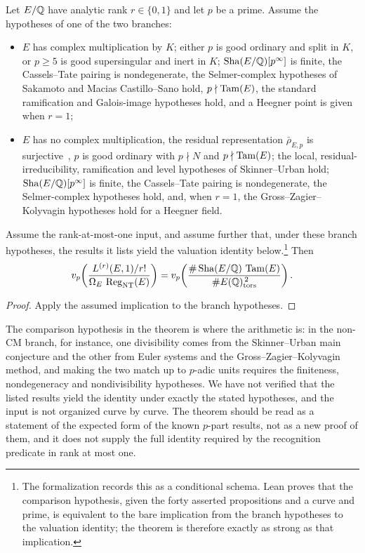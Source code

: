 \begin{theorem}\label{thm:closure:t-cascade-rank-le-1}
Let $E/\mathbb{Q}$ have analytic rank $r\in\{0,1\}$ and let $p$ be a prime.
Assume the hypotheses of one of the two branches:
\begin{itemize}
\item[(CM)] $E$ has complex multiplication by $K$; either $p$ is good
  ordinary and split in $K$, or $p\ge5$ is good supersingular and inert in
  $K$; $\operatorname{Sha}(E/\mathbb{Q})[p^\infty]$ is finite, the Cassels--Tate pairing is
  nondegenerate, the Selmer-complex hypotheses of Sakamoto and Macias
  Castillo--Sano hold, $p\nmid\operatorname{Tam}(E)$, the standard ramification and
  Galois-image hypotheses hold, and a Heegner point is given when $r=1$;
\item[(non-CM)] $E$ has no complex multiplication, the residual
  representation $\bar\rho_{E,p}$ is surjective~\citep{Serre1972}, $p$ is
  good ordinary with $p\nmid N$ and $p\nmid\operatorname{Tam}(E)$; the local,
  residual-irreducibility, ramification and level hypotheses of
  Skinner--Urban hold; $\operatorname{Sha}(E/\mathbb{Q})[p^\infty]$ is finite, the Cassels--Tate
  pairing is nondegenerate, the Selmer-complex hypotheses hold, and, when
  $r=1$, the Gross--Zagier--Kolyvagin hypotheses hold for a Heegner field.
\end{itemize}
Assume the rank-at-most-one input, and assume further that, under these
branch hypotheses, the results it lists yield the valuation identity
below.\footnote{The formalization records this as a conditional schema.  Lean
proves that the comparison hypothesis, given the forty asserted
propositions and a curve and prime, is equivalent to the bare implication
from the branch hypotheses to the valuation identity; the theorem is
therefore exactly as strong as that implication.}  Then
\[
  v_p\!\left(\frac{L^{(r)}(E,1)/r!}{\Omega_E\,\operatorname{Reg}_{\mathrm{NT}}(E)}\right)
  =
  v_p\!\left(\frac{\#\operatorname{Sha}(E/\mathbb{Q})\,\operatorname{Tam}(E)}{\#E(\mathbb{Q})_{\operatorname{tors}}^{\,2}}\right).
\]
\end{theorem}

\begin{proof}
Apply the assumed implication to the branch hypotheses.
\end{proof}

The comparison hypothesis in the theorem is where the arithmetic is: in
the non-CM branch, for instance, one divisibility comes from the
Skinner--Urban main conjecture and the other from Euler systems and the
Gross--Zagier--Kolyvagin method, and making the two match up to $p$-adic
units requires the finiteness, nondegeneracy and nondivisibility
hypotheses.  We have not verified that the listed results yield the
identity under exactly the stated hypotheses, and the input is not
organized curve by curve.  The theorem should be read as a statement of
the expected form of the known $p$-part results, not as a new proof of
them, and it does not supply the full identity required by the
recognition predicate in rank at most one.

